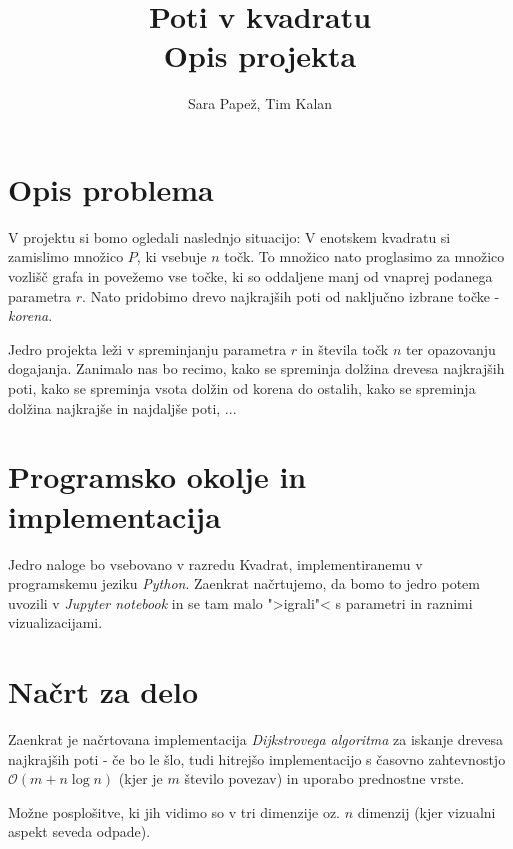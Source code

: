 \documentclass[a4paper]{article}
\title{Poti v kvadratu \\
       \large Opis projekta}
\author{Sara Papež, Tim Kalan}
\begin{document}
\begin{titlepage}
 \maketitle

\end{titlepage}

\section{Opis problema}
V projektu si bomo ogledali naslednjo situacijo: V enotskem kvadratu si zamislimo 
množico $P$, ki vsebuje $n$ točk. To množico nato proglasimo za množico vozlišč 
grafa in povežemo vse točke, ki so oddaljene manj od vnaprej podanega parametra $r$.
Nato pridobimo drevo najkrajših poti od naključno izbrane točke - \textit{korena}.

Jedro projekta leži v spreminjanju parametra $r$ in števila točk $n$ ter opazovanju 
dogajanja. Zanimalo nas bo recimo, kako se spreminja dolžina drevesa najkrajših poti,
kako se spreminja vsota dolžin od korena do ostalih, kako se spreminja dolžina 
najkrajše in najdaljše poti, ... 


\section{Programsko okolje in implementacija}
Jedro naloge bo vsebovano v razredu Kvadrat, implementiranemu v programskemu jeziku
\emph{Python}. Zaenkrat načrtujemo, da bomo to jedro potem uvozili v \emph{Jupyter
notebook} in se tam malo ">igrali"< s parametri in raznimi vizualizacijami.

\section{Načrt za delo}
Zaenkrat je načrtovana implementacija \emph{Dijkstrovega algoritma} za iskanje 
drevesa najkrajših poti - če bo le šlo, tudi hitrejšo implementacijo s časovno 
zahtevnostjo $\mathcal{O}(m + n\log n)$ (kjer je $m$ število povezav) in uporabo 
prednostne vrste.

Možne posplošitve, ki jih vidimo so v tri dimenzije oz. $n$ dimenzij (kjer vizualni
aspekt seveda odpade).
\end{document}
